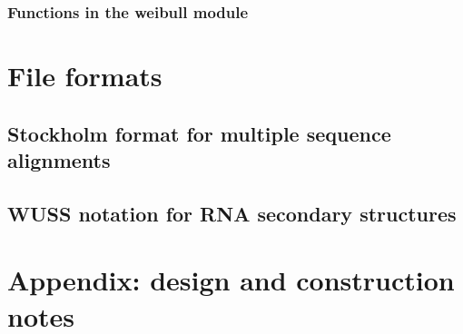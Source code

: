 \documentclass[11pt]{book}
\begin{document}
\subsection{Functions in the weibull module}







\newpage
\chapter{File formats}

\section{Stockholm format for multiple sequence alignments}




\newpage
\section{WUSS notation for RNA secondary structures}




\newpage
\chapter{Appendix: design and construction notes}




\newpage
\newcommand{\bibfont}{\footnotesize}


\end{document}
